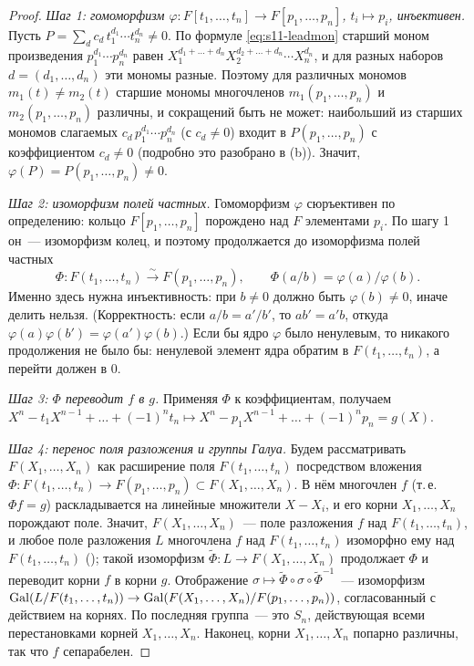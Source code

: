 \begin{proof}
\emph{Шаг 1: гомоморфизм $\varphi\colon F[t_1,\dots,t_n]\to F[p_1,\dots,p_n]$, $t_i\mapsto p_i$, инъективен.} Пусть
$P=\sum_dc_d\,t_1^{d_1}\cdots t_n^{d_n}\ne0$. По формуле \eqref{eq:s11-leadmon} старший моном произведения
$p_1^{d_1}\cdots p_n^{d_n}$ равен $X_1^{d_1+\dots+d_n}X_2^{d_2+\dots+d_n}\cdots X_n^{d_n}$, и для разных наборов
$d=(d_1,\dots,d_n)$ эти мономы разные. Поэтому для различных мономов $m_1(t)\ne m_2(t)$ старшие мономы многочленов
$m_1(p_1,\dots,p_n)$ и $m_2(p_1,\dots,p_n)$ различны, и сокращений быть не может: наибольший из старших мономов
слагаемых $c_d\,p_1^{d_1}\cdots p_n^{d_n}$ (с $c_d\ne0$) входит в $P(p_1,\dots,p_n)$ с коэффициентом $c_d\ne0$ (подробно
это разобрано в (b)). Значит, $\varphi(P)=P(p_1,\dots,p_n)\ne0$.

\emph{Шаг 2: изоморфизм полей частных.} Гомоморфизм $\varphi$ сюръективен по определению: кольцо $F[p_1,\dots,p_n]$
порождено над $F$ элементами $p_i$. По шагу 1 он~--- изоморфизм колец, и поэтому продолжается до изоморфизма полей частных
\[
\Phi\colon F(t_1,\dots,t_n)\xrightarrow{\ \sim\ }F(p_1,\dots,p_n),\qquad \Phi(a/b)=\varphi(a)/\varphi(b).
\]
Именно здесь нужна инъективность: при $b\ne0$ должно быть $\varphi(b)\ne0$, иначе делить нельзя. (Корректность:
если $a/b=a'/b'$, то $ab'=a'b$, откуда $\varphi(a)\varphi(b')=\varphi(a')\varphi(b)$.) Если бы ядро $\varphi$ было ненулевым,
то никакого продолжения не было бы: ненулевой элемент ядра обратим в $F(t_1,\dots,t_n)$, а перейти должен в $0$.

\emph{Шаг 3: $\Phi$ переводит $f$ в $g$.} Применяя $\Phi$ к коэффициентам, получаем
$X^n-t_1X^{n-1}+\dots+(-1)^nt_n\mapsto X^n-p_1X^{n-1}+\dots+(-1)^np_n=g(X)$.

\emph{Шаг 4: перенос поля разложения и группы Галуа.} Будем рассматривать $F(X_1,\dots,X_n)$ как расширение поля
$F(t_1,\dots,t_n)$ посредством вложения $\Phi\colon F(t_1,\dots,t_n)\to F(p_1,\dots,p_n)\subset F(X_1,\dots,X_n)$. В нём
многочлен $f$ (т.\,е.\ $\Phi f=g$) раскладывается на линейные множители $X-X_i$, и его корни $X_1,\dots,X_n$ порождают
поле. Значит, $F(X_1,\dots,X_n)$~--- поле разложения $f$ над $F(t_1,\dots,t_n)$, и любое поле разложения $L$ многочлена $f$
над $F(t_1,\dots,t_n)$ изоморфно ему над $F(t_1,\dots,t_n)$ (); такой изоморфизм $\tilde\Phi\colon
L\to F(X_1,\dots,X_n)$ продолжает $\Phi$ и переводит корни $f$ в корни $g$. Отображение
$\sigma\mapsto\tilde\Phi\circ\sigma\circ\tilde\Phi^{-1}$~--- изоморфизм $\operatorname{Gal}(L/F(t_1,\dots,t_n))\to
\operatorname{Gal}(F(X_1,\dots,X_n)/F(p_1,\dots,p_n))$, согласованный с действием на корнях. По  последняя группа~--- это $S_n$,
действующая всеми перестановками корней $X_1,\dots,X_n$. Наконец, корни $X_1,\dots,X_n$ попарно различны, так что $f$
сепарабелен.
\end{proof}

